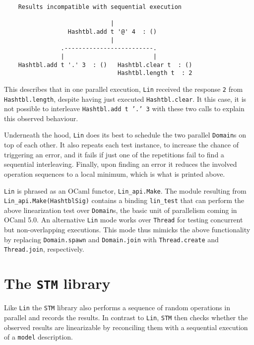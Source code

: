 \documentclass[twocolumn,10pt]{article}
\begin{document}
\begingroup{}
\begin{lstlisting}
    Results incompatible with sequential execution
    
                              |
                  Hashtbl.add t '@' 4  : ()
                              |
                .-------------------------.
                |                         |
    Hashtbl.add t '.' 3  : ()   Hashtbl.clear t  : ()
                                Hashtbl.length t  : 2
\end{lstlisting}
\endgroup

This describes that in one parallel execution, \texttt{Lin} received the
response \texttt{2} from \texttt{Hashtbl.length}, despite having just executed
\texttt{Hashtbl.clear}.  It this case, it is not possible to interleave
\texttt{Hashtbl.add t '.' 3} with these two calls to explain this observed
behaviour.

Underneath the hood, \texttt{Lin} does its best to schedule the two parallel
\texttt{Domain}s on top of each other. It also repeats each test instance, to
increase the chance of triggering an error, and it fails if just one
of the repetitions fail to find a sequential interleaving. Finally,
upon finding an error it reduces the involved operation sequences to a
local minimum, which is what is printed above.

\texttt{Lin} is phrased as an OCaml functor, \lstinline|Lin_api.Make|. The module
resulting from \lstinline|Lin_api.Make(HashtblSig)| contains a binding \lstinline|lin_test|
that can perform the above linearization test over \texttt{Domain}s, the
basic unit of parallelism coming in OCaml 5.0. An alternative \texttt{Lin}
mode works over \texttt{Thread} for testing concurrent but non-overlapping
executions. This mode thus mimicks the above functionality by
replacing \texttt{Domain.spawn} and \texttt{Domain.join} with \texttt{Thread.create} and
\texttt{Thread.join}, respectively.


\section{The \texttt{STM} library}

Like \texttt{Lin} the \texttt{STM} library also performs a sequence of random
operations in parallel and records the results. In contrast to \texttt{Lin},
\texttt{STM} then checks whether the observed results are linearizable by
reconciling them with a sequential execution of a \texttt{model} description.
\end{document}
